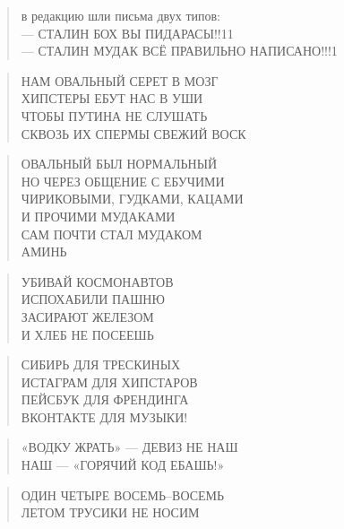 \poemtitle{***}
\begin{verse}
в редакцию шли письма двух типов:\\
— СТАЛИН БОХ ВЫ ПИДАРАСЫ!!11\\
— СТАЛИН МУДАК ВСЁ ПРАВИЛЬНО НАПИСАНО!!!1
\end{verse}

\poemtitle{***}
\begin{verse}
НАМ ОВАЛЬНЫЙ СЕРЕТ В МОЗГ\\
ХИПСТЕРЫ ЕБУТ НАС В УШИ\\
ЧТОБЫ ПУТИНА НЕ СЛУШАТЬ\\
СКВОЗЬ ИХ СПЕРМЫ СВЕЖИЙ ВОСК
\end{verse}

\poemtitle{***}
\begin{verse}
ОВАЛЬНЫЙ БЫЛ НОРМАЛЬНЫЙ\\
НО ЧЕРЕЗ ОБЩЕНИЕ С ЕБУЧИМИ\\
ЧИРИКОВЫМИ, ГУДКАМИ, КАЦАМИ\\
И ПРОЧИМИ МУДАКАМИ\\
САМ ПОЧТИ СТАЛ МУДАКОМ\\
АМИНЬ
\end{verse}

\poemtitle{***}
\begin{verse}
УБИВАЙ КОСМОНАВТОВ\\
ИСПОХАБИЛИ ПАШНЮ\\
ЗАСИРАЮТ ЖЕЛЕЗОМ\\
И ХЛЕБ НЕ ПОСЕЕШЬ
\end{verse}

\poemtitle{***}
\begin{verse}
СИБИРЬ ДЛЯ ТРЕСКИНЫХ\\
ИСТАГРАМ ДЛЯ ХИПСТАРОВ\\
ПЕЙСБУК ДЛЯ ФРЕНДИНГА\\
ВКОНТАКТЕ ДЛЯ МУЗЫКИ!
\end{verse}

\poemtitle{***}
\begin{verse}
«ВОДКУ ЖРАТЬ» — ДЕВИЗ НЕ НАШ\\
НАШ — «ГОРЯЧИЙ КОД ЕБАШЬ!»
\end{verse}

\poemtitle{***}
\begin{verse}
ОДИН ЧЕТЫРЕ ВОСЕМЬ–ВОСЕМЬ\\
ЛЕТОМ ТРУСИКИ НЕ НОСИМ
\end{verse}

